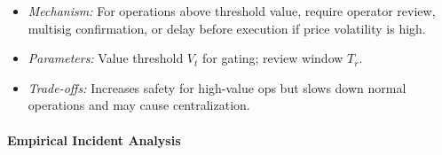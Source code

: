 \begin{itemize}
\begin{itemize}
                \begin{itemize}
                    \item \textit{Mechanism:} For operations above threshold value, require operator review, multisig confirmation, or delay before execution if price volatility is high.
                    \item \textit{Parameters:} Value threshold $V_t$ for gating; review window $T_r$.
                    \item \textit{Trade-offs:} Increases safety for high-value ops but slows down normal operations and may cause centralization.
                \end{itemize}
        \end{itemize}
\end{itemize}

\paragraph{Empirical Incident Analysis}
